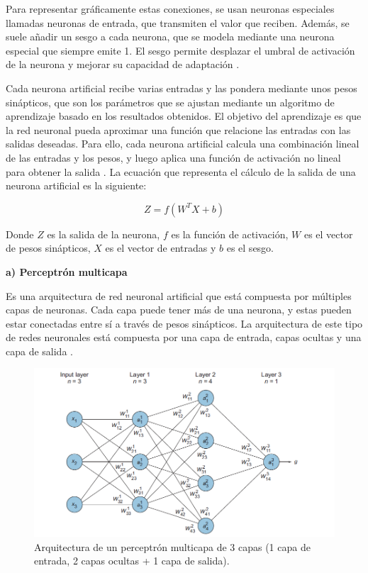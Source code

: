 Para representar gráficamente estas conexiones, se usan neuronas especiales llamadas neuronas de entrada, que transmiten el valor que reciben. Además, se suele añadir un sesgo a cada neurona, que se modela mediante una neurona especial que siempre emite 1. El sesgo permite desplazar el umbral de activación de la neurona y mejorar su capacidad de adaptación \cite{geron2019hands}.

Cada neurona artificial recibe varias entradas y las pondera mediante unos pesos sinápticos, que son los parámetros que se ajustan mediante un algoritmo de aprendizaje basado en los resultados obtenidos. El objetivo del aprendizaje es que la red neuronal pueda aproximar una función que relacione las entradas con las salidas deseadas. Para ello, cada neurona artificial calcula una combinación lineal de las entradas y los pesos, y luego aplica una función de activación no lineal para obtener la salida \cite{patterson2017deep}. La ecuación que representa el cálculo de la salida de una neurona artificial es la siguiente:

\begin{equation} Z = f(W^T X + b) \end{equation}

Donde $Z$ es la salida de la neurona, $f$ es la función de activación, $W$ es el vector de pesos sinápticos, $X$ es el vector de entradas y $b$ es el sesgo.

\textbf{a) Perceptrón multicapa}

Es una arquitectura de red neuronal artificial que está compuesta por múltiples capas de neuronas. Cada capa puede tener más de una neurona, y estas pueden estar conectadas entre sí a través de pesos sinápticos. La arquitectura de este tipo de redes neuronales está compuesta por una capa de entrada, capas ocultas y una capa de salida \cite{geron2019hands}.

\begin{figure}[H]
    \begin{center}
        \includegraphics[width=1\textwidth]{Images/mlp.png}
    \end{center}
    \caption{Arquitectura de un perceptrón multicapa de 3 capas (1 capa de entrada, 2 capas ocultas + 1 capa de salida).}
    \label{fig:mlp}
\end{figure}

